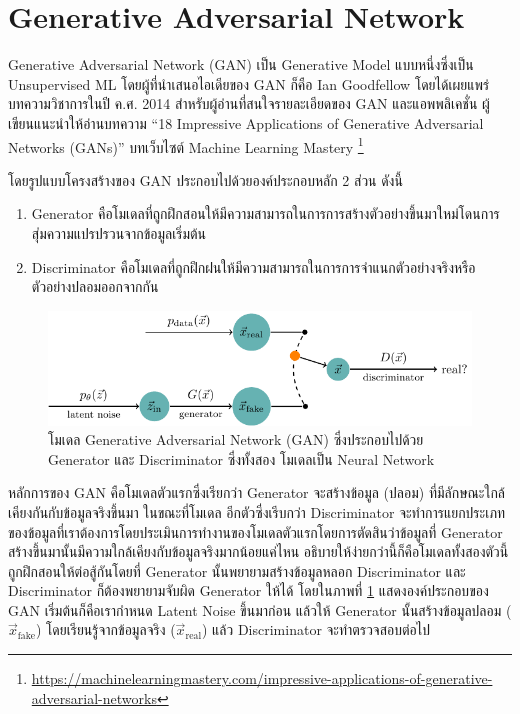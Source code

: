 \section{Generative Adversarial Network}
\label{sec:gan}

Generative Adversarial Network (GAN) เป็น Generative Model แบบหนึ่งซึ่งเป็น Unsupervised ML โดยผู้ที่นำเสนอไอเดียของ GAN 
ก็คือ Ian Goodfellow โดยได้เผยแพร่บทความวิชาการในปี ค.ศ. 2014\autocite{goodfellow2014b} สำหรับผู้อ่านที่สนใจรายละเอียดของ 
GAN และแอพพลิเคชั่น ผู้เขียนแนะนำให้อ่านบทความ \enquote{18 Impressive Applications of Generative Adversarial Networks 
(GANs)} บทเว็บไซต์ Machine Learning Mastery%
\footnote{\url{https://machinelearningmastery.com/impressive-applications-of-generative-adversarial-networks}}

\noindent โดยรูปแบบโครงสร้างของ GAN ประกอบไปด้วยองค์ประกอบหลัก 2 ส่วน ดังนี้

\begin{enumerate}
    \item Generator คือโมเดลที่ถูกฝึกสอนให้มีความสามารถในการการสร้างตัวอย่างขึ้นมาใหม่โดนการสุ่มความแปรปรวนจากข้อมูลเริ่มต้น
    \item Discriminator คือโมเดลที่ถูกฝึกฝนให้มีความสามารถในการการจำแนกตัวอย่างจริงหรือตัวอย่างปลอมออกจากกัน
\end{enumerate}

\begin{figure}[htbp]
    \includegraphics[width=\linewidth]{fig/generative_adversarial_nets.pdf}
    \caption{โมเดล Generative Adversarial Network (GAN) ซึ่งประกอบไปด้วย Generator และ Discriminator ซึ่งทั้งสอง%
    โมเดลเป็น Neural Network}
    \label{fig:gan}
\end{figure}

หลักการของ GAN คือโมเดลตัวแรกซึ่งเรียกว่า Generator จะสร้างข้อมูล (ปลอม) ที่มีลักษณะใกล้เคียงกันกับข้อมูลจริงขึ้นมา ในขณะที่โมเดล%
อีกตัวซึ่งเรีบกว่า Discriminator จะทำการแยกประเภทของข้อมูลที่เราต้องการโดยประเมินการทำงานของโมเดลตัวแรกโดยการตัดสินว่าข้อมูลที่ 
Generator สร้างขึ้นมานั้นมีความใกล้เคียงกับข้อมูลจริงมากน้อยแค่ไหน อธิบายให้ง่ายกว่านี้ก็คือโมเดลทั้งสองตัวนี้ถูกฝึกสอนให้ต่อสู้กันโดยที่
Generator นั้นพยายามสร้างข้อมูลหลอก Discriminator และ Discriminator ก็ต้องพยายามจับผิด Generator ให้ได้ โดยในภาพที่ 
\ref{fig:gan} แสดงองค์ประกอบของ GAN เริ่มต้นก็คือเรากำหนด Latent Noise ขึ้นมาก่อน แล้วให้ Generator นั้นสร้างข้อมูลปลอม 
($\vec{x}_{\text{fake}}$) โดยเรียนรู้จากข้อมูลจริง ($\vec{x}_{\text{real}}$) แล้ว Discriminator จะทำตรวจสอบต่อไป

